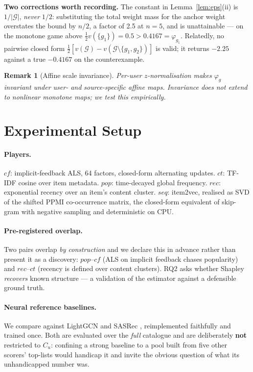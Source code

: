 \documentclass[11pt]{article}
\newtheorem{remark}{Remark}
\newcommand{\G}{\mathcal{G}}
\newcommand{\Cu}{C_u}
\begin{document}
\noindent\textbf{Two corrections worth recording.} The constant in
Lemma~\ref{lem:eps}(ii) is $1/|\G|$, \emph{never} $1/2$: substituting the total
weight mass for the anchor weight overstates the bound by $n/2$, a factor of
2.5 at $n=5$, and is unattainable --- on the monotone game above
$\tfrac12 v(\{g_1\}) = 0.5 > 0.4167 = \varphi_{g_1}$. Relatedly, no pairwise
closed form $\tfrac12[v(\G) - v(\G\setminus\{g_1,g_2\})]$ is valid; it returns
$-2.25$ against a true $-0.4167$ on the counterexample.

\begin{remark}[Affine scale invariance]
Per-user $z$-normalisation makes $\varphi_g$ invariant under user- and
source-specific affine maps. Invariance does \emph{not} extend to nonlinear
monotone maps; we test this empirically.
\end{remark}

\section{Experimental Setup}

\paragraph{Players.} $cf$: implicit-feedback ALS, 64 factors, closed-form
alternating updates. $ct$: TF-IDF cosine over item metadata. $pop$:
time-decayed global frequency. $rec$: exponential recency over an item's
content cluster. $seq$: item2vec, realised as SVD of the shifted PPMI
co-occurrence matrix, the closed-form equivalent of skip-gram with negative
sampling \citep{levy2014neural} and deterministic on CPU.

\paragraph{Pre-registered overlap.} Two pairs overlap \emph{by construction}
and we declare this in advance rather than present it as a discovery:
$pop$--$cf$ (ALS on implicit feedback chases popularity) and $rec$--$ct$
(recency is defined over content clusters). RQ2 asks whether Shapley
\emph{recovers} known structure --- a validation of the estimator against a
defensible ground truth.

\paragraph{Neural reference baselines.} We compare against LightGCN
\citep{he2020lightgcn} and SASRec \citep{kang2018sasrec}, reimplemented
faithfully and trained once. Both are evaluated over the \emph{full}
catalogue and are deliberately \textbf{not} restricted to $\Cu$: confining a
strong baseline to a pool built from five other scorers' top-lists would
handicap it and invite the obvious question of what its unhandicapped number
was.
\end{document}
